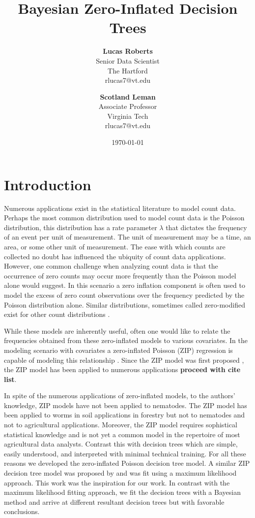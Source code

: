 \documentclass{article}
\title{{\bf Bayesian Zero-Inflated Decision Trees} \\ }
\author{ {\bf Lucas Roberts}  \\
Senior Data Scientist \\
The Hartford \\
{\small rlucas7@vt.edu}
}
\author{ {\bf Scotland Leman}  \\
Associate Professor \\
Virginia Tech \\
{\small rlucas7@vt.edu}
}
\date{\today}
\begin{document}
\maketitle


\section{Introduction}
\label{ch:preliminaries}

Numerous applications exist in the statistical literature to model count data. Perhaps the most common distribution used to model count data is the Poisson distribution, this distribution has a rate parameter $\lambda$ that dictates the frequency of an event per unit of measurement. The unit of measurement may be a time, an area, or some other unit of measurement. The ease with which counts are collected no doubt has influenced the ubiquity of count data applications. However, one common challenge when analyzing count data is that the occurrence of zero counts may occur more frequently than the Poisson model alone would suggest. In this scenario a zero inflation component is often used to model the excess of zero count observations over the frequency predicted by the Poisson distribution alone. Similar distributions, sometimes called zero-modified exist for other count distributions \cite{cite loss distributions book}. 

While these models are inherently useful, often one would like to relate the frequencies obtained from these zero-inflated models to various covariates. In the modeling scenario with covariates a zero-inflated Poisson (ZIP) regression is capable of modeling this relationship \cite{lambert1992zero}. Since the ZIP model was first proposed \cite{cameron1986econometric}, the ZIP model has been applied to numerous applications \textbf{proceed with cite list}. 

In spite of the numerous applications of zero-inflated models, to the authors' knowledge, ZIP models have not been applied to nematodes. The ZIP model has been applied to worms in soil applications in forestry \cite{sileshi2006selecting} but not to nematodes and not to agricultural applications. Moreover, the ZIP model requires sophistical statistical knowledge and is not yet a common model in the repertoire of most agricultural data analysts. Contrast this with decision trees which are simple, easily understood, and interpreted with minimal technical training. For all these reasons we developed the zero-inflated Poisson decision tree model. A similar ZIP decision tree model was proposed by \cite{lee2006decision} and was fit using a maximum likelihood approach. This work was the inspiration for our work. In contrast with the maximum likelihood fitting approach, we fit the decision trees with a Bayesian method and arrive at different resultant decision trees but with favorable conclusions. 
\end{document}
